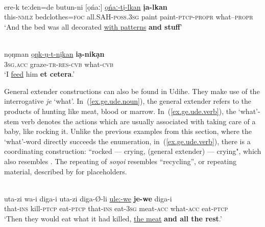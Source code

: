 \documentclass[output=paper,colorlinks,citecolor=brown
\ChapterDOI{10.5281/zenodo.15697577}
]{langscibook}
\begin{document}
 \ea \label{ex.ge.evn.noun1}
 \\
\gll ere-k teːden=de butun-ni [ọńaː] \uline{ọńaː-tị-lkan} \textbf{ịa-lkan}\\
this-\textsc{nmlz} bedclothes=\textsc{foc} all.SAH-\textsc{poss.3sg} paint paint-\textsc{ptcp}-\textsc{propr} what--\textsc{propr}\\
\glt `And the bed was all decorated \uline{with patterns} \textbf{and stuff}' \\
 \z
{}

 \ea \label{ex.ge.evn.verb}
 \\
 \gll nọŋman \uline{ọŋk-ụ-t-nịkan} \textbf{iạ-nikạn}\\
 \textsc{3sg.acc} graze-\textsc{tr}-\textsc{res}-\textsc{cvb} what-\textsc{cvb}\\
\glt `I \uline{feed} him \textbf{et cetera}.' \\
 \z
{} 

General extender constructions can also be found in Udihe. They make use of the interrogative \textit{je} `what'. In~(\ref{ex.ge.ude.noun}), the general extender refers to the products of hunting like meat, blood or marrow. In~(\ref{ex.ge.ude.verb}), the `what'-stem verb denotes the actions which are usually associated with taking care of a baby, like rocking it. Unlike the previous examples from this section, where the `what'-word directly succeeds the enumeration, in~(\ref{ex.ge.ude.verb}), there is a coordinating construction:
``rocked — crying, (general extender) — crying", which also resembles . The repeating of \textit{soŋoi} resembles ``recycling'', or repeating material, described by \citet{Podlesskaya2010} for placeholders.

 \ea \label{ex.ge.ude.noun}
 \\
\gll uta-zi wa-i diga-i uta-zi diga-Ø-li \uline{ule:-we} \textbf{je-we} diga-i\\
 that-\textsc{ins} kill-\textsc{ptcp} eat-\textsc{ptcp} that-\textsc{ins} eat-\textsc{3sg} meat-\textsc{acc} what-\textsc{acc} eat-\textsc{ptcp}\\
\glt `Then they would eat what it had killed, \uline{the meat} \textbf{and all the rest}.' \\
 \z
{}
\end{document}
